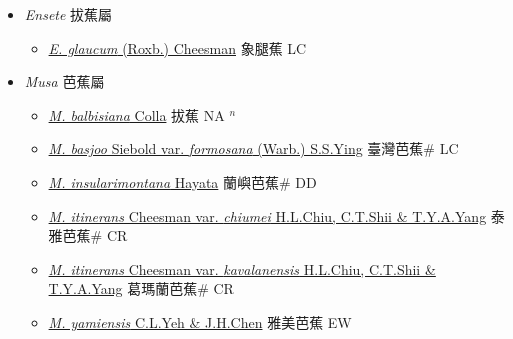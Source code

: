 
  \begin{itemize}
 \item[] \textit{Ensete} 拔蕉屬
                    
  \begin{itemize}
        \item[] \href{http://www.theplantlist.org/tpl1.1/search?q=Ensete+glaucum}{\textit{E. glaucum} (Roxb.) Cheesman}   象腿蕉 LC
  \end{itemize}
 \item[] \textit{Musa} 芭蕉屬
                    
  \begin{itemize}
        \item[] \href{http://www.theplantlist.org/tpl1.1/search?q=Musa+balbisiana}{\textit{M. balbisiana} Colla}   拔蕉 NA $^n$
        \item[] \href{http://www.theplantlist.org/tpl1.1/search?q=Musa+basjoo+var.+formosana}{\textit{M. basjoo} Siebold var. \textit{formosana} (Warb.) S.S.Ying}   臺灣芭蕉\# LC
        \item[] \href{http://www.theplantlist.org/tpl1.1/search?q=Musa+insularimontana}{\textit{M. insularimontana} Hayata}   蘭嶼芭蕉\# DD
        \item[] \href{http://www.theplantlist.org/tpl1.1/search?q=Musa+itinerans+var.+chiumei}{\textit{M. itinerans} Cheesman var. \textit{chiumei} H.L.Chiu, C.T.Shii \& T.Y.A.Yang}   泰雅芭蕉\# CR
        \item[] \href{http://www.theplantlist.org/tpl1.1/search?q=Musa+itinerans+var.+kavalanensis}{\textit{M. itinerans} Cheesman var. \textit{kavalanensis} H.L.Chiu, C.T.Shii \& T.Y.A.Yang}   葛瑪蘭芭蕉\# CR
        \item[] \href{http://www.theplantlist.org/tpl1.1/search?q=Musa+yamiensis}{\textit{M. yamiensis} C.L.Yeh \& J.H.Chen}   雅美芭蕉 EW
  \end{itemize}
  \end{itemize}
